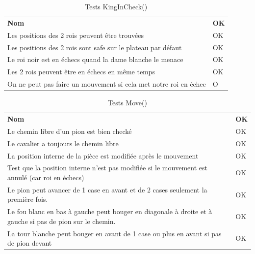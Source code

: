 \documentclass[12pt]{article}
\begin{document}
\begin{table}[h!]
\caption{Tests KingInCheck()}
\begin{tabular}{ll}
\textbf{Nom}                                                     & \textbf{OK }\\
Les positions des 2 rois peuvent être trouvées                   & OK \\
Les positions des 2 rois sont safe sur le plateau par défaut     & OK \\
Le roi noir est en échecs quand la dame blanche le menace        & OK \\
Les 2 rois peuvent être en échecs en même temps                  & OK \\
On ne peut pas faire un mouvement si cela met notre roi en échec & O
\end{tabular}
\end{table}

\begin{table}[h!]
\caption{Tests Move()}
\begin{tabular}{ll}
\textbf{Nom}                                                                                             & \textbf{OK }\\
Le chemin libre d'un pion est bien checké                                                                & OK \\
Le cavalier a toujours le chemin libre                                                                   & OK \\
La position interne de la pièce est modifiée après le mouvement                                          & OK \\
Test que la position interne n'est pas modifiée si le mouvement est annulé (car roi en échecs)           & OK \\
Le pion peut avancer de 1 case en avant et de 2 cases seulement la première fois.                        & OK \\
Le fou blanc en bas à gauche peut bouger en diagonale à droite et à gauche si pas de pion sur le chemin. & OK \\
La tour blanche peut bouger en avant de 1 case ou plus en avant si pas de pion devant                    & OK
\end{tabular}
\end{table}
\end{document}
